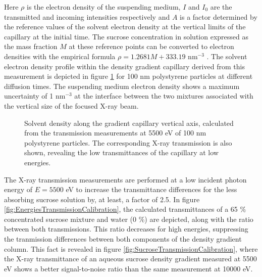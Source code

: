 Here \(\rho\) is the electron density of the suspending medium, $I$ and $I_0$ are the transmitted and incoming intensities respectively and $A$ is a factor determined by the reference values of the solvent electron density at the vertical limits of the capillary at the initial time. The sucrose concentration in solution expressed as the mass fraction \( M \) at these reference points can be converted to electron densities with the empirical formula \( \rho=1.2681M+333.19 \) nm\(^{-3}\) \citep{haynes_crc_2012}. The solvent electron density profile within the density gradient capillary derived from this measurement is depicted in figure \ref{fig:KiskerTransmissionCalibration} for 100 nm polystyrene particles at different diffusion times. The suspending medium electron density shows a maximum uncertainty of 1 nm$^{-3}$ at the interface between the two mixtures associated with the vertical size of the focused X-ray beam.

\begin{figure}%
	\centering
		
		\caption{Solvent density along the gradient capillary vertical axis, calculated from the transmission measurements at 5500 eV of 100 nm polystyrene particles. The corresponding X-ray transmission is also shown, revealing the low transmittances of the capillary at low energies.}
		\label{fig:KiskerTransmissionCalibration}
\end{figure}

The X-ray transmission measurements are performed at a low incident photon energy of $E = 5500$ eV to increase the transmittance differences for the less absorbing sucrose solution by, at least, a factor of 2.5. In figure \ref{fig:EnergiesTransmissionCalibration}, the calculated transmittances of a 65 $\%$ concentrated sucrose mixture and water (0 $\%$) are depicted, along with the ratio between both transmissions. This ratio decreases for high energies, suppressing the tranmission differences between both components of the density gradient column. This fact is revealed in figure \ref{fig:SucroseTransmissionCalibration}, where the X-ray transmittance of an aqueous sucrose density gradient measured at 5500 eV shows a better signal-to-noise ratio than the same measurement at 10000 eV.

